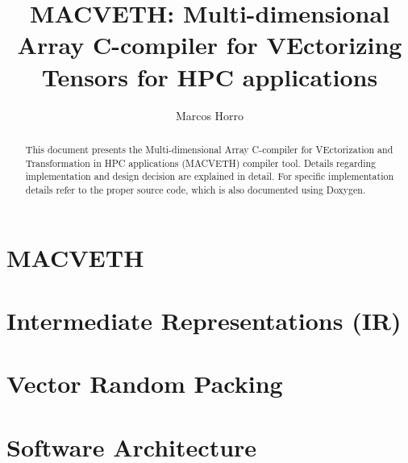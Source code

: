 \documentclass[a4paper,12pt]{memoir}
\title{\textbf{MACVETH}: \textbf{M}ulti-dimensional \textbf{A}rray
    \textbf{C}-compiler for \textbf{VE}ctorizing
    \textbf{T}ensors for \textbf{H}PC applications}
\author{Marcos Horro}
\date{}
\begin{document}
\maketitle

\begin{abstract}
	This document presents the Multi-dimensional Array C-compiler for VEctorization
	and Transformation in HPC applications (MACVETH) compiler tool. Details
	regarding implementation and design decision are explained in detail. For
	specific implementation details refer to the proper source code, which is also
	documented using Doxygen.
\end{abstract}

\chapter{MACVETH}
\label{chapter:Intro}


\newpage
\chapter{Intermediate Representations (IR)}
\label{chapter:IR}


\newpage
\chapter{Vector Random Packing}
\label{chapter:VectorRandom}


\newpage
\chapter{Software Architecture}
\label{chapter:Software}


\newpage


\end{document}
